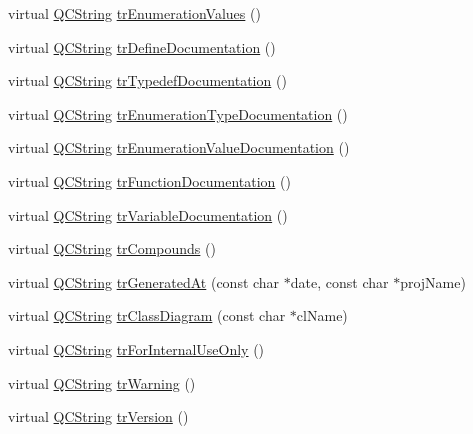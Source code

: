 \begin{DoxyCompactItemize}
\item 
virtual \hyperlink{class_q_c_string}{Q\+C\+String} \hyperlink{class_translator_danish_afc90bece8c05803ca2cfc639f29e827f}{tr\+Enumeration\+Values} ()
\item 
virtual \hyperlink{class_q_c_string}{Q\+C\+String} \hyperlink{class_translator_danish_a3ea2d1c4881bade028ef74f6202db437}{tr\+Define\+Documentation} ()
\item 
virtual \hyperlink{class_q_c_string}{Q\+C\+String} \hyperlink{class_translator_danish_a740284318dfd8030d3b4aef905923f02}{tr\+Typedef\+Documentation} ()
\item 
virtual \hyperlink{class_q_c_string}{Q\+C\+String} \hyperlink{class_translator_danish_a4b64eda641679cb576ebbd9d84028c95}{tr\+Enumeration\+Type\+Documentation} ()
\item 
virtual \hyperlink{class_q_c_string}{Q\+C\+String} \hyperlink{class_translator_danish_a09c94be7996ebad077f4d606a302072b}{tr\+Enumeration\+Value\+Documentation} ()
\item 
virtual \hyperlink{class_q_c_string}{Q\+C\+String} \hyperlink{class_translator_danish_a0bf26de2a9d886f7046fe57b6ca8c7ec}{tr\+Function\+Documentation} ()
\item 
virtual \hyperlink{class_q_c_string}{Q\+C\+String} \hyperlink{class_translator_danish_a1dc26788215b395df5e6a7cc140cab65}{tr\+Variable\+Documentation} ()
\item 
virtual \hyperlink{class_q_c_string}{Q\+C\+String} \hyperlink{class_translator_danish_a20d7f7a0a8de7b063a7178f77123a9b6}{tr\+Compounds} ()
\item 
virtual \hyperlink{class_q_c_string}{Q\+C\+String} \hyperlink{class_translator_danish_a6ffe3905541fea064f1c8f27d6a27d39}{tr\+Generated\+At} (const char $\ast$date, const char $\ast$proj\+Name)
\item 
virtual \hyperlink{class_q_c_string}{Q\+C\+String} \hyperlink{class_translator_danish_a12f703b4f627d232fe88506886b4c832}{tr\+Class\+Diagram} (const char $\ast$cl\+Name)
\item 
virtual \hyperlink{class_q_c_string}{Q\+C\+String} \hyperlink{class_translator_danish_a33302b45ae174db34bb205bc05250384}{tr\+For\+Internal\+Use\+Only} ()
\item 
virtual \hyperlink{class_q_c_string}{Q\+C\+String} \hyperlink{class_translator_danish_a8fb5364c3f0c25f881cc5e17804cecf2}{tr\+Warning} ()
\item 
virtual \hyperlink{class_q_c_string}{Q\+C\+String} \hyperlink{class_translator_danish_a3ec30a802881bcce47cc7cefc233579a}{tr\+Version} ()

\end{DoxyCompactItemize}
